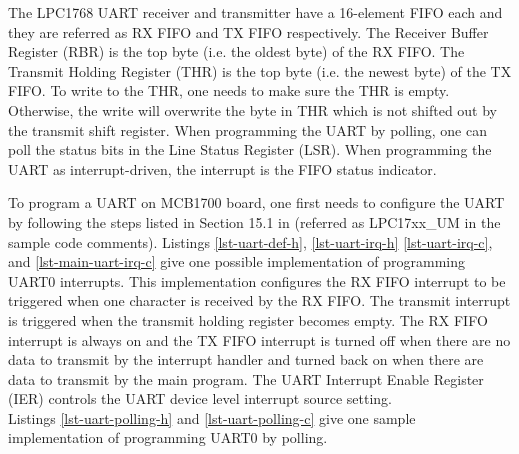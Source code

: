 The LPC1768 UART receiver and transmitter have a 16-element FIFO each and they are referred as RX FIFO and TX FIFO respectively. The Receiver Buffer Register (RBR) is the top byte (i.e. the oldest byte) of the RX FIFO. The Transmit Holding Register (THR) is the top byte (i.e. the newest byte) of the TX FIFO. To write to the THR, one needs to make sure the THR is empty. Otherwise, the write will overwrite the byte in THR which is not shifted out by the transmit shift register. When programming the UART by polling, one can poll the status bits in the Line Status Register (LSR). When programming the UART as interrupt-driven, the interrupt is the FIFO status indicator. 

To program a UART on MCB1700 board, one first needs to configure the UART by following the steps listed in Section 15.1 in \cite{nxp.lpc17xx.manual} (referred as LPC17xx\_UM in the sample code comments). 
Listings \ref{lst-uart-def-h}, \ref{lst-uart-irq-h} \ref{lst-uart-irq-c}, and \ref{lst-main-uart-irq-c} give one possible implementation of programming UART0 interrupts.
This implementation configures the RX FIFO interrupt to be triggered when one character is received by the RX FIFO. The transmit interrupt is triggered when the transmit holding register becomes empty.
The RX FIFO interrupt is always on and the TX FIFO interrupt is turned off when there are no data to transmit by the interrupt handler and turned back on when there are data to transmit by the main program. The UART Interrupt Enable Register (IER) controls the UART device level interrupt source setting. \\






Listings 
\ref{lst-uart-polling-h} and \ref{lst-uart-polling-c} give one sample implementation of programming UART0 by polling.


%

